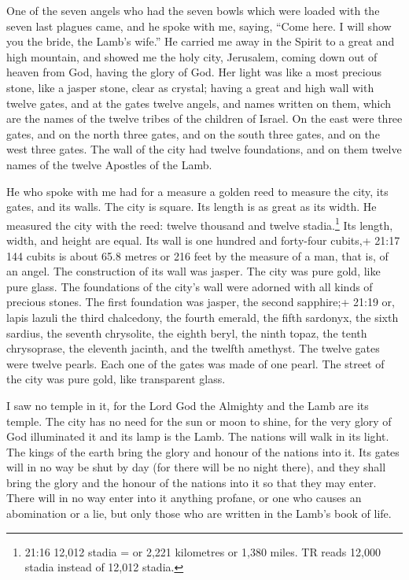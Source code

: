  One of the seven angels who had the seven bowls which were
loaded with the seven last plagues came, and he spoke with me, saying,
``Come here. I will show you the bride, the Lamb's wife.'' 
He carried me away in the Spirit to a great and high mountain, and
showed me the holy city, Jerusalem, coming down out of heaven from God,
 having the glory of God. Her light was like a most
precious stone, like a jasper stone, clear as crystal; 
having a great and high wall with twelve gates, and at the gates twelve
angels, and names written on them, which are the names of the twelve
tribes of the children of Israel.  On the east were three
gates, and on the north three gates, and on the south three gates, and
on the west three gates.  The wall of the city had twelve
foundations, and on them twelve names of the twelve Apostles of the
Lamb.

 He who spoke with me had for a measure a golden reed to
measure the city, its gates, and its walls.  The city is
square. Its length is as great as its width. He measured the city with
the reed: twelve thousand and twelve stadia.\footnote{21:16 12,012
  stadia = or 2,221 kilometres or 1,380 miles. TR reads 12,000 stadia
  instead of 12,012 stadia.} Its length, width, and height are equal.
 Its wall is one hundred and forty-four cubits,+ 21:17 144
cubits is about 65.8 metres or 216 feet by the measure of a man, that
is, of an angel.  The construction of its wall was jasper.
The city was pure gold, like pure glass.  The foundations
of the city's wall were adorned with all kinds of precious stones. The
first foundation was jasper, the second sapphire;+ 21:19 or, lapis
lazuli the third chalcedony, the fourth emerald,  the fifth
sardonyx, the sixth sardius, the seventh chrysolite, the eighth beryl,
the ninth topaz, the tenth chrysoprase, the eleventh jacinth, and the
twelfth amethyst.  The twelve gates were twelve pearls.
Each one of the gates was made of one pearl. The street of the city was
pure gold, like transparent glass.

 I saw no temple in it, for the Lord God the Almighty and
the Lamb are its temple.  The city has no need for the sun
or moon to shine, for the very glory of God illuminated it and its lamp
is the Lamb.  The nations will walk in its light. The kings
of the earth bring the glory and honour of the nations into it.
 Its gates will in no way be shut by day (for there will be
no night there),  and they shall bring the glory and the
honour of the nations into it so that they may enter. 
There will in no way enter into it anything profane, or one who causes
an abomination or a lie, but only those who are written in the Lamb's
book of life.

